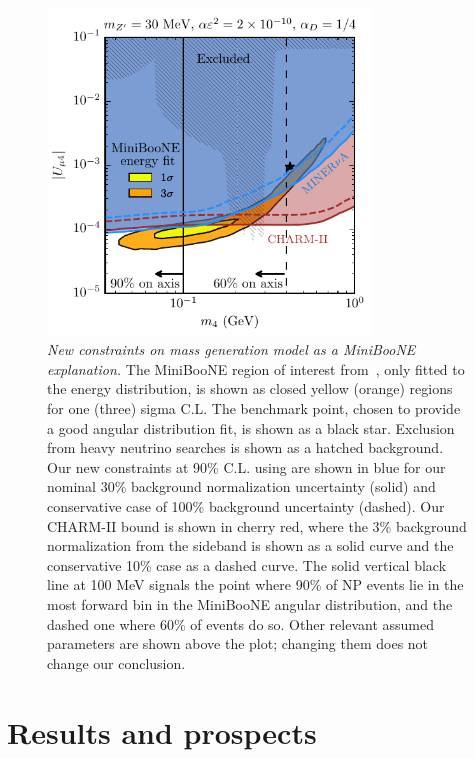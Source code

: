 %
\begin{figure}[t]
    \centering
    \includegraphics[width=3.38in]{bounds.pdf}
    \caption[New constraints on dark neutrinos.]{{\textit{New constraints on mass generation model as a MiniBooNE explanation.}} The MiniBooNE region of interest from~\cite{Bertuzzo:2018itn}, only fitted to the energy distribution, is shown as closed yellow (orange) regions for one (three) sigma C.L. The benchmark point, chosen to provide a good angular distribution fit, is shown as a black star. Exclusion from heavy neutrino searches is shown as a hatched background. Our new constraints at 90\% C.L. using \minerva are shown in blue for our nominal 30\% background normalization uncertainty (solid) and conservative case of 100\% background uncertainty (dashed). Our CHARM-II bound is shown in cherry red, where the 3\% background normalization from the sideband is shown as a solid curve and the conservative 10\% case as a dashed curve. The solid vertical black line at 100 MeV signals the point where 90\% of NP events lie in the most forward bin in the MiniBooNE angular distribution, and the dashed one where 60\% of events do so. Other relevant assumed parameters are shown above the plot; changing them does not change our conclusion.}
    \label{fig:final_plot}
\end{figure}
%

\section{Results and prospects}

